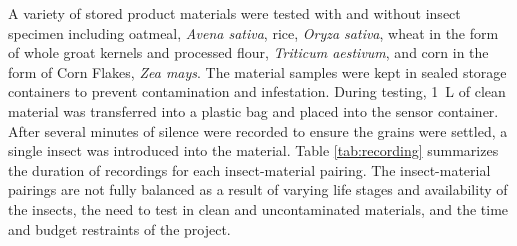 
\newpage
A variety of stored product materials were tested with and without insect specimen including oatmeal, \textit{Avena sativa}, rice, \textit{Oryza sativa}, wheat in the form of whole groat kernels and processed flour, \textit{Triticum aestivum}, and corn in the form of Corn Flakes, \textit{Zea mays}. The material samples were kept in sealed storage containers to prevent contamination and infestation. During testing, \SI{1}{\liter} of clean material was transferred into a plastic bag and placed into the sensor container. After several minutes of silence were recorded to ensure the grains were settled, a single insect was introduced into the material. Table \ref{tab:recording} summarizes the duration of recordings for each insect-material pairing. The insect-material pairings are not fully balanced as a result of varying life stages and availability of the insects, the need to test in clean and uncontaminated materials, and the time and budget restraints of the project.

